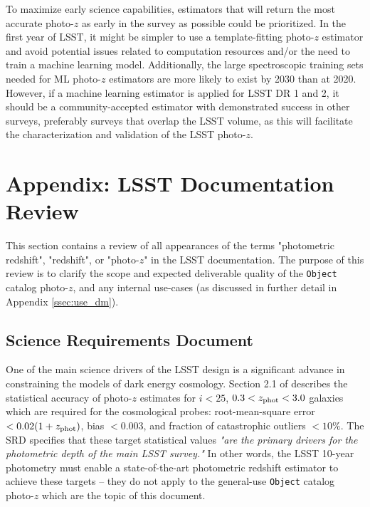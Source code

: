 \documentclass[DM,lsstdraft,toc]{lsstdoc}
\begin{document}
To maximize early science capabilities, estimators that will return the most accurate photo-$z$ as early in the survey as possible could be prioritized.
In the first year of LSST, it might be simpler to use a template-fitting photo-$z$ estimator and avoid potential issues related to computation resources and/or the need to train a machine learning model.
Additionally, the large spectroscopic training sets needed for ML photo-$z$ estimators are more likely to exist by 2030 than at 2020.
However, if a machine learning estimator is applied for LSST DR 1 and 2, it should be a community-accepted estimator with demonstrated success in other surveys, preferably surveys that overlap the LSST volume, as this will facilitate the characterization and validation of the LSST photo-$z$.


\clearpage
\section{Appendix: LSST Documentation Review}\label{sec:docs}

This section contains a review of all appearances of the terms "photometric redshift", "redshift", or "photo-$z$" in the LSST documentation.
The purpose of this review is to clarify the scope and expected deliverable quality of the {\tt Object} catalog photo-$z$, and any internal use-cases (as discussed in further detail in Appendix \ref{ssec:use_dm}).

\subsection{Science Requirements Document}\label{ssec:docs_srd}

One of the main science drivers of the LSST design is a significant advance in constraining the models of dark energy cosmology. 
Section 2.1 of  describes the statistical accuracy of photo-$z$ estimates for $i<25$, $0.3<z_{\rm phot}<3.0$ galaxies which are required for the cosmological probes: root-mean-square error $<0.02(1+z_{\rm phot})$, bias $<0.003$, and fraction of catastrophic outliers $<10\%$.
The SRD specifies that these target statistical values {\it "are the primary drivers for the photometric depth of the main LSST survey."} 
In other words, the LSST 10-year photometry must enable a state-of-the-art photometric redshift estimator to achieve these targets -- they do not apply to the general-use {\tt Object} catalog photo-$z$ which are the topic of this document.
\end{document}
